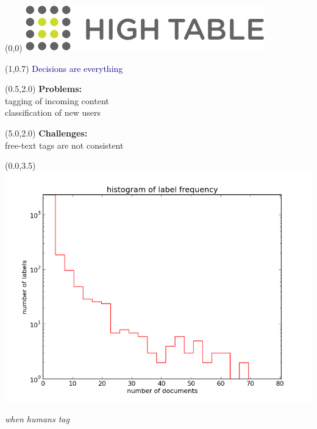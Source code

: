 \documentclass{article}
\renewcommand{\Large}       {\fontsize{20.74}{25}\selectfont}
\newcommand{\VERYHuge}      {\fontsize{61.92}{77}\selectfont}
\begin{document}
\begin{textblock}{3}(0,0)
\includegraphics[width=3\TPHorizModule]{images/ht-logo.png}
\end{textblock}

\begin{textblock}{8}(1,0.7)\Large
\hfill \textcolor{DarkBlue}{\VERYHuge Decisions are everything}
\end{textblock}

\begin{textblock}{5}(0.5,2.0)\Large
\textbf{Problems:}\\
tagging of incoming content\\
classification of new users\\
\vspace{0.5in}
\end{textblock}

\begin{textblock}{5}(5.0,2.0)\Large
\textbf{Challenges:}\\
free-text tags are not consistent\\
\end{textblock}

\begin{textblock}{10}(0.0,3.5)\Large\centering
\includegraphics[width=6\TPHorizModule]{images/labels_discussions_dochist.png}

\textit{when humans tag}
\end{textblock}
\end{document}
